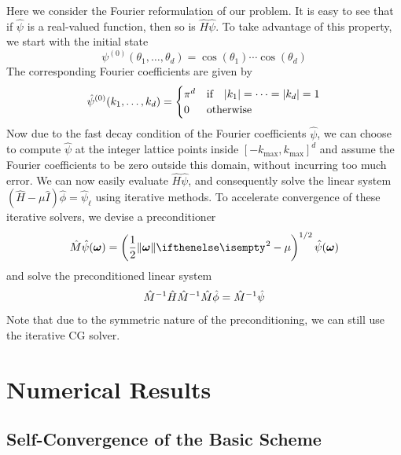 \documentclass{amsart}
\begin{document}
Here we consider the Fourier reformulation of our problem. It is easy to see
that if $\hat{\psi}$ is a real-valued function, then so is $\hat{H}
\hat{\psi}$. To take advantage of this property, we start with the initial
state
\begin{equation}
  \psi^{(0)}(\theta_1, \ldots, \theta_d) = \cos(\theta_1) \cdots \cos(\theta_d)
\end{equation}
The corresponding Fourier coefficients are given by
\begin{equation}
  \hat{\psi}^{(0)}(k_1, \ldots, k_d) =
  \begin{cases}
    \pi^d & \text{if} \quad \lvert k_1\rvert = \cdots = \lvert k_d\rvert = 1 \\
    0 & \text{otherwise}
  \end{cases}
\end{equation}
Now due to the fast decay condition of the Fourier coefficients $\hat{\psi}$,
we can choose to compute $\hat{\psi}$ at the integer lattice points inside
$[-k_\text{max}, k_\text{max}]^d$ and assume the Fourier coefficients to be
zero outside this domain, without incurring too much error. We can now easily
evaluate $\hat{H} \hat{\psi}$, and consequently solve the linear system
$(\hat{H} - \mu \hat{I}) \hat{\phi} = \hat{\psi}_\ell$ using iterative methods.
To accelerate convergence of these iterative solvers, we devise a
preconditioner
\begin{equation}
  \hat{M} \hat{\psi}(\Vec{\omega}) = \left(\frac{1}{2} \Norm{\Vec{\omega}}^2 -
  \mu\right)^{1/2} \hat{\psi}(\Vec{\omega})
\end{equation}
and solve the preconditioned linear system
\begin{equation}
  \hat{M}^{-1} \Hat{H} \Hat{M}^{-1} \hat{M} \hat{\phi} = \hat{M}^{-1}
  \hat{\psi}
\end{equation}
Note that due to the symmetric nature of the preconditioning, we can still use
the iterative CG solver.

\section{Numerical Results}

\subsection{Self-Convergence of the Basic Scheme}
\end{document}
